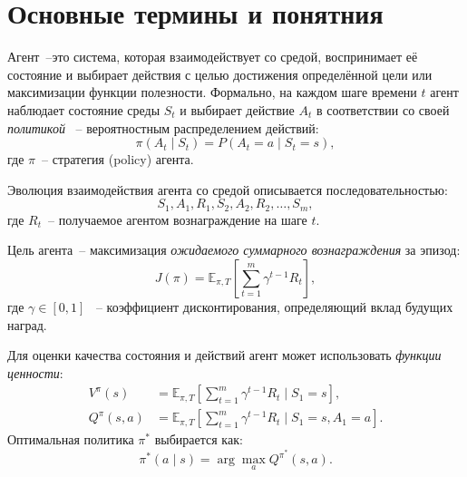 \section{Основные термины и понятния}

\begin{definition}
    \label{def:agent}
    Агент~--это система, которая взаимодействует со средой, воспринимает её состояние и выбирает действия с целью достижения определённой цели или максимизации функции полезности. Формально, на каждом шаге времени $t$ агент наблюдает состояние среды $S_t$ и выбирает действие $A_t$ в соответствии со своей \emph{политикой} ~-- вероятностным распределением действий:
    \begin{equation}
    \pi(A_t \mid S_t) = P(A_t = a \mid S_t = s),
    \end{equation}
    где $\pi$~-- стратегия (policy) агента.  
\end{definition}

Эволюция взаимодействия агента со средой описывается последовательностью:
\begin{equation}
S_1, A_1, R_1, S_2, A_2, R_2, \dots, S_m,
\end{equation}
где $R_t$~-- получаемое агентом вознаграждение на шаге $t$.  

Цель агента~-- максимизация \emph{ожидаемого суммарного вознаграждения} за эпизод:
\begin{equation}
J(\pi) = \mathbb{E}_{\pi, T}\left[\sum_{t=1}^{m} \gamma^{t-1} R_t\right],
\end{equation}
где $\gamma \in [0,1]$ ~-- коэффициент дисконтирования, определяющий вклад будущих наград.

Для оценки качества состояния и действий агент может использовать \emph{функции ценности}:
\begin{align}
V^{\pi}(s) &= \mathbb{E}_{\pi, T}\!\left[\sum_{t=1}^{m} \gamma^{t-1} R_t \mid S_1 = s\right], \\
Q^{\pi}(s,a) &= \mathbb{E}_{\pi, T}\!\left[\sum_{t=1}^{m} \gamma^{t-1} R_t \mid S_1 = s, A_1 = a\right].
\end{align}
Оптимальная политика $\pi^*$ выбирается как:
\begin{equation}
\pi^*(a \mid s) = \arg\max_{a} Q^{\pi^*}(s,a).
\end{equation}

